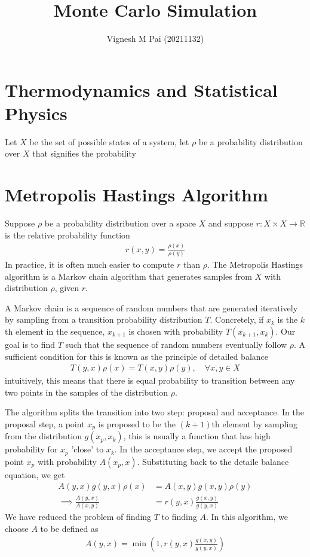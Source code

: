 \documentclass{article}
\title{Monte Carlo Simulation}
\author{Vignesh M Pai (20211132)}
\date{}
\begin{document}
\maketitle

\section{Thermodynamics and Statistical Physics}

Let $X$ be the set of possible states of a system, let $\rho$ be a probability distribution over $X$
that signifies the probability 

\section{Metropolis Hastings Algorithm}

Suppose $\rho$ be a probability distribution over a space $X$
and suppose $r: X \times X \to \mathbb{R}$ is the relative probability function
\begin{align*}
    r(x, y) = \frac{\rho(x)}{\rho(y)}
\end{align*}
In practice, it is often much easier to compute $r$ than $\rho$.
The Metropolis Hastings algorithm is a Markov chain algorithm that generates samples from $X$ with distribution $\rho$, given $r$.

A Markov chain is a sequence of random numbers that are generated iteratively by sampling from a transition probability distribution $T$.
Concretely, if $x_k$ is the $k$th element in the sequence, $x_{k+1}$ is chosen with probability $T(x_{k + 1}, x_k)$. Our goal is to find $T$
such that the sequence of random numbers eventually follow $\rho$. A sufficient condition for this is known as the principle of detailed balance
\begin{align*}
    T(y, x) \rho(x) = T(x, y) \rho(y),\quad \forall x, y \in X
\end{align*}
intuitively, this means that there is equal probability to transition between any two points in the samples of the distribution $\rho$.

The algorithm splits the transition into two step: proposal and acceptance. In the proposal step, a point $x_p$ is proposed to be the $(k+1)$th element
by sampling from the distribution $g(x_p, x_k)$, this is usually a function that has high probability for $x_p$ 'close' to $x_k$. In the acceptance step,
we accept the proposed point $x_p$ with probability $A(x_p, x)$. Substituting back to the detaile balance equation, we get
\begin{align*}
    A(y, x) g(y, x) \rho(x) &= A(x, y) g(x, y) \rho(y) \\
    \implies \frac{A(y, x)}{A(x, y)} &= r(y, x) \frac{g(x, y)}{g(y, x)}
\end{align*}
We have reduced the problem of finding $T$ to finding $A$. In this algorithm, we choose $A$ to be defined as
\begin{align*}
    A(y, x) = \min\left(1, r(y, x) \frac{g(x, y)}{g(y, x)}\right)
\end{align*}
\end{document}
